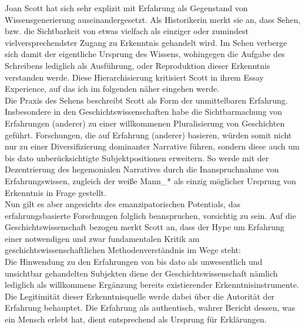 Joan Scott hat sich sehr explizit mit Erfahrung als Gegenstand von
Wissensgenerierung auseinandergesetzt. Als Historikerin merkt sie an, dass
Sehen, bzw. die Sichtbarkeit von etwas vielfach als einziger oder zumindest
vielversprechendster Zugang zu Erkenntnis gehandelt wird. Im Sehen verberge
sich damit der eigentliche Ursprung des Wissens, wohingegen die Aufgabe des
Schreibens lediglich als Ausführung, oder Reproduktion dieser Erkenntnis
verstanden werde. Diese Hierarchisierung kritisiert Scott in ihrem Essay
\glqq Experience\grqq \footnotemark {}, auf das ich im folgenden näher eingehen werde.\\
Die Praxis des Sehens beschreibt Scott als Form der unmittelbaren Erfahrung.
Insbesondere in den Geschichtswissenschaften habe die Sichtbarmachung von
Erfahrungen (anderer) zu einer willkommenen \glqq Pluralisierung von
Geschichten\grqq \footnotemark {} geführt. Forschungen, die auf Erfahrung (anderer) basieren, würden somit
nicht nur zu einer Diversifizierung dominanter Narrative führen, sondern diese
auch um bis dato unberücksichtigte Subjektpositionen erweitern.\footnotemark {} So werde mit
der Dezentrierung des hegemonialen Narratives durch die Inanspruchnahme von
Erfahrungswissen, zugleich der weiße Mann\_* als einzig möglicher Ursprung von
Erkenntnis in Frage gestellt. \\
Nun gilt es aber angesichts des emanzipatorischen Potentials, das
erfahrungsbasierte Forschungen folglich beanspruchen, vorsichtig zu sein. Auf
die Geschichtswissenschaft bezogen merkt Scott an, dass der Hype um Erfahrung
einer notwendigen und zwar fundamentalen Kritik am geschichtswissenschaftlichen
Methodenverständnis im Wege steht: \\
Die Hinwendung zu den Erfahrungen von bis
dato als unwesentlich und unsichtbar gehandelten Subjekten diene der
Geschichtswissenschaft nämlich lediglich als willkommene Ergänzung bereits
existierender Erkenntnisinstrumente. Die Legitimität dieser Erkenntnisquelle
werde dabei über die \glqq Autorität der Erfahrung \grqq \footnotemark
{} behauptet. Die Erfahrung als \glqq authentisch, wahrer
Bericht dessen, was ein Mensch erlebt hat, dient entsprechend als Ursprung für
Erklärungen.\grqq \footnotemark {}\\

